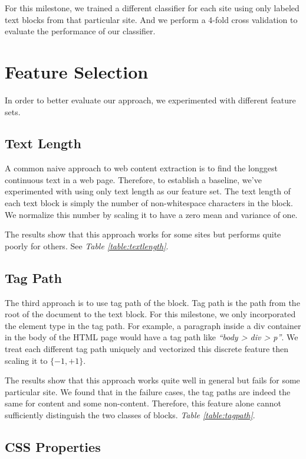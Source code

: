\documentclass{acm_proc_article-sp}
\begin{document}
For this milestone, we trained a different classifier for each site using only labeled text blocks from that particular site. And we perform a 4-fold cross validation to evaluate the performance of our classifier.

\section{Feature Selection}

In order to better evaluate our approach, we experimented with different feature sets.

\subsection{Text Length}

A common naive approach to web content extraction is to find the longgest continuous text in a web page. Therefore, to establish a baseline, we've experimented with using only text length as our feature set. The text length of each text block is simply the number of non-whitespace characters in the block. We normalize this number by scaling it to have a zero mean and variance of one.

The results show that this approach works for some sites but performs quite poorly for others. See \emph{Table \ref{table:textlength}}.

\subsection{Tag Path}

The third approach is to use tag path of the block. Tag path is the path from the root of the document to the text block. For this milestone, we only incorporated the element type in the tag path. For example, a paragraph inside a div container in the body of the HTML page would have a tag path like \emph{``body > div > p''}. We treat each different tag path uniquely and vectorized this discrete feature then scaling it to $\{-1, +1\}$.

The results show that this approach works quite well in general but fails for some particular site. We found that in the failure cases, the tag paths are indeed the same for content and some non-content. Therefore, this feature alone cannot sufficiently distinguish the two classes of blocks. \emph{Table \ref{table:tagpath}}.

\subsection{CSS Properties}
\end{document}
